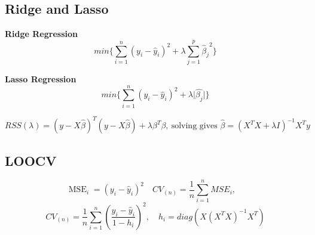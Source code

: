 \documentclass[a4paper,9pt,fleqn]{extarticle}
\DeclareMathOperator{\MSE}{MSE}
\begin{document}
\begin{minipage}[t]{0.45\textwidth}
    \subsection{Ridge and Lasso}
\begin{minipage}{0.45\textwidth}
    \textbf{Ridge Regression}
        \[ 
            min \{ \sum_{i=1}^{n}(y_i - \hat{y}_i)^2 + \lambda \sum_{j=1}^{p}{\hat{\beta}_j}^2 \} 
        \]
\end{minipage}
\hspace{0.05\textwidth}
\begin{minipage}{0.45\textwidth}
    \textbf{Lasso Regression}
        \[ 
            min \{ \sum_{i=1}^{n}(y_i - \hat{y}_i)^2 + \lambda \vert \hat{\beta_j} \vert \} 
        \]
\end{minipage}
\[
    RSS(\lambda) = (y - X\hat{\beta})^T(y-X\hat{\beta}) + \lambda \beta^T\beta ,\
    \text{solving gives }
    \hat{\beta} = (X^TX + \lambda I)^{-1}X^Ty
\]
\end{minipage}
\hfill
\begin{minipage}[t]{0.45\textwidth}
\subsection*{LOOCV}
\[
\MSE_i = (y_i - \hat{y}_i)^2 \quad CV_{(n)} = \frac{1}{n}\sum_{i=1}^{n}MSE_i ,\quad
\]
\[
CV_{(n)} = \frac{1}{n}\sum_{i=1}^{n}\left(\frac{y_i - \hat{y}_i}{1 - h_i}\right)^2 ,\quad 
h_i = diag(X(X^TX)^{-1}X^T) 
\]
\end{minipage}
\end{document}
